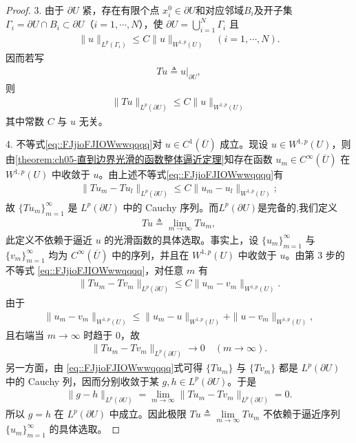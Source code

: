 \documentclass[../../main.tex]{subfiles}
\begin{document}
\begin{proof}
3. 由于 $\partial U$ 紧，存在有限个点 $x_{i}^{0}\in\partial U$和对应邻域$B_i$及开子集 $\Gamma_{i}=\partial U\cap B_i\subset\partial U$（$i=1,\cdots,N$），使 $\partial U=\bigcup_{i=1}^{N}\Gamma_{i}$ 且
\begin{align*}
\|u\|_{L^{p}(\Gamma_{i})}\leqslant C\|u\|_{W^{1,p}(U)}\quad (i=1,\cdots,N).
\end{align*}
因而若写
\begin{align*}
Tu\triangleq u|_{\partial U},
\end{align*}
则
\begin{align}\label{eq::FJjioFJIOWwwqqqq}
\|Tu\|_{L^{p}(\partial U)}\leqslant C\|u\|_{W^{1,p}(U)}
\end{align}
其中常数 $C$ 与 $u$ 无关。

4. 不等式\eqref{eq::FJjioFJIOWwwqqqq}对 $u\in C^{1}(\overline{U})$ 成立。现设 $u\in W^{1,p}(U)$，则由\cref{theorem:ch05-直到边界光滑的函数整体逼近定理}知存在函数 $u_{m}\in C^{\infty}(\overline{U})$ 在 $W^{1,p}(U)$ 中收敛于 $u$。由上述不等式\eqref{eq::FJjioFJIOWwwqqqq}有
\begin{align}
\|Tu_{m}-Tu_{l}\|_{L^{p}(\partial U)}\leqslant C\|u_{m}-u_{l}\|_{W^{1,p}(U)};
\end{align}
故 $\{Tu_{m}\}_{m=1}^{\infty}$ 是 $L^{p}(\partial U)$ 中的 Cauchy 序列。而$L^{p}(\partial U)$是完备的,我们定义
\begin{align*}
Tu\triangleq\lim_{m\to\infty}Tu_{m},
\end{align*}
此定义不依赖于逼近 $u$ 的光滑函数的具体选取。事实上，设 \(\{u_m\}_{m=1}^\infty\) 与 \(\{v_m\}_{m=1}^\infty\) 均为 \(C^\infty(\overline U)\) 中的序列，并且在 \(W^{1,p}(U)\) 中收敛于 \(u\)。由第 3 步的不等式 \eqref{eq::FJjioFJIOWwwqqqq}，对任意 \(m\) 有
\begin{align*}
\|Tu_m-Tv_m\|_{L^p(\partial U)}
\leqslant C\|u_m-v_m\|_{W^{1,p}(U)}.
\end{align*}
由于
\begin{align*}
\|u_m-v_m\|_{W^{1,p}(U)}
\leqslant \|u_m-u\|_{W^{1,p}(U)}+\|u-v_m\|_{W^{1,p}(U)},
\end{align*}
且右端当 \(m\to\infty\) 时趋于 \(0\)，故
\begin{align*}
\|Tu_m-Tv_m\|_{L^p(\partial U)}\to 0\quad (m\to\infty).
\end{align*}
另一方面，由 \eqref{eq::FJjioFJIOWwwqqqq}式可得 \(\{Tu_m\}\) 与 \(\{Tv_m\}\) 都是 \(L^p(\partial U)\) 中的 Cauchy 列，因而分别收敛于某 \(g,h\in L^p(\partial U)\)。于是
\begin{align*}
\|g-h\|_{L^p(\partial U)}
=\lim\limits_{m\to\infty}\|Tu_m-Tv_m\|_{L^p(\partial U)}
=0.
\end{align*}
所以 \(g=h\) 在 \(L^p(\partial U)\) 中成立。因此极限 \(Tu\triangleq\lim\limits_{m\to\infty}Tu_m\) 不依赖于逼近序列 \(\{u_m\}_{m=1}^\infty\) 的具体选取。


\end{proof}
\end{document}

